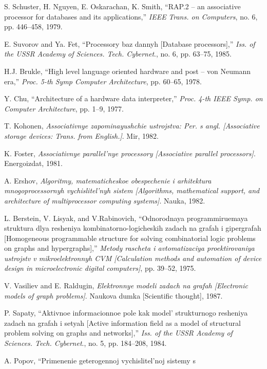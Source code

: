 \documentclass{article}
\begin{document}
{\begin{multicols}{2}
{\begin{enumerate}[label={[\arabic*]}]
    \item S. Schuster, H. Nguyen, E. Oskarachan, K. Smith, “RAP.2 – an
associative processor for databases and its applications,” \textsl{IEEE}
\textit{Trans. on Computers}, no. 6, pp. 446–458, 1979.

    \item E. Suvorov and Ya. Fet, “Processory baz dannyh [Database processors],” \textit{Iss. of the USSR Academy of Sciences. Tech. Cybernet}.,
no. 6, pp. 63–75, 1985.
    \item  H.J. Brukle, “High level language oriented hardware and post –
von Neumann era,” \textit{Proc. 5-th Symp Computer Architecture}, pp.
60–65, 1978.
    \item Y. Chu, “Architecture of a hardware data interpreter,” \textit{Proc. 4-th
IEEE Symp. on Computer Architecture}, pp. 1–9, 1977.
    \item T. Kohonen, \textit{Associativnye zapominayushchie ustrojstva: Per. s
angl. [Associative storage devices: Trans. from English.]}. Mir,
1982.
    \item K. Foster, \textit{Associativnye parallel’nye processory [Associative
parallel processors]}. Energoizdat, 1981.
    \item A. Ershov, \textit{Algoritmy, matematicheskoe obespechenie i arhitektura
mnogoprocessornyh vychislitel’nyh sistem [Algorithms, mathematical support, and architecture of multiprocessor computing
systems]}. Nauka, 1982.
    \item L. Berstein, V. Lisyak, and V.Rabinovich, “Odnorodnaya programmiruemaya struktura dlya resheniya kombinatorno-logicheskih
zadach na grafah i gipergrafah [Homogeneous programmable
structure for solving combinatorial logic problems on graphs and
hypergraphs],” \textit{Metody rascheta i avtomatizaciya proektirovaniya
ustrojstv v mikroelektronnyh CVM [Calculation methods and
automation of device design in microelectronic digital computers]},
pp. 39–52, 1975.
    \item V. Vasiliev and E. Raldugin, \textit{Elektronnye modeli zadach na
grafah [Electronic models of graph problems]}. Naukova dumka
[Scientific thought], 1987.
    \item P. Sapaty, “Aktivnoe informacionnoe pole kak model’ strukturnogo
resheniya zadach na grafah i setyah [Active information field as
a model of structural problem solving on graphs and networks],”
\textit{Iss. of the USSR Academy of Sciences. Tech. Cybernet}., no. 5, pp.
184–208, 1984.
    \item A. Popov, “Primenenie geterogennoj vychislitel’noj sistemy s

\end{enumerate}}
\end{multicols}}
\end{document}
